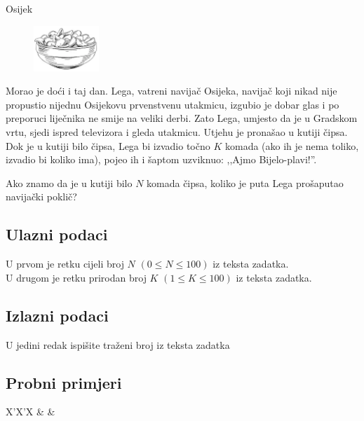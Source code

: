 \begin{statement}[
  problempoints=20,
  timelimit=1 sekunda,
  memorylimit=512 MiB,
]{Osijek}

\setlength\intextsep{-0.1cm}
\begin{figure}
\centering
\includegraphics[width=0.22\textwidth]{img/chips.png}
\end{figure}

Morao je doći i taj dan. Lega, vatreni navijač Osijeka, navijač koji nikad
nije propustio nijednu Osijekovu prvenstvenu utakmicu, izgubio je dobar glas
i po preporuci liječnika ne smije na veliki derbi. Zato Lega, umjesto da je u
Gradskom vrtu, sjedi ispred televizora i gleda utakmicu. Utjehu je pronašao u
kutiji čipsa. Dok je u kutiji bilo čipsa, Lega bi izvadio točno $K$ komada (ako
ih je nema toliko, izvadio bi koliko ima), pojeo ih i šaptom uzviknuo: ,,Ajmo
Bijelo-plavi!''.

Ako znamo da je u kutiji bilo $N$ komada čipsa, koliko je puta
Lega prošaputao navijački poklič?

\subsection*{Ulazni podaci}
U prvom je retku cijeli broj $N$ $(0 \le N \le 100)$ iz teksta zadatka.\\
U drugom je retku prirodan broj $K$ $(1 \le K \le 100)$ iz teksta zadatka.

\subsection*{Izlazni podaci}
U jedini redak ispišite traženi broj iz teksta zadatka


\subsection*{Probni primjeri}
\begin{tabularx}{\textwidth}{X'X'X}
 &
 &
\end{tabularx}


\end{statement}
